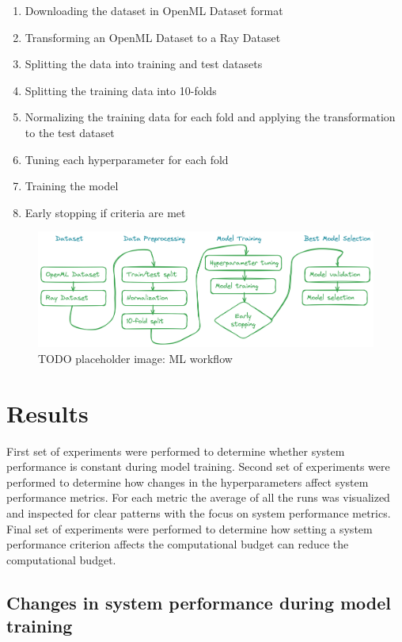 \begin{enumerate}
    \item Downloading the dataset in OpenML Dataset format
    \item Transforming an OpenML Dataset to a Ray Dataset
    \item Splitting the data into training and test datasets
    \item Splitting the training data into 10-folds
    \item Normalizing the training data for each fold and applying the transformation to the test dataset
    \item Tuning each hyperparameter for each fold
    \item Training the model
    \item Early stopping if criteria are met
\end{enumerate}

\begin{figure}[h]
    \includegraphics[width=12cm]{assets/ml_workflow1.png}
    \caption{TODO placeholder image: ML workflow}
    \label{figure:mlworkflow}
\end{figure}

\section{Results}

First set of experiments were performed to determine whether system performance is constant during model training. Second set of experiments were performed to determine how changes in the hyperparameters affect system performance metrics. For each metric the average of all the runs was visualized and inspected for clear patterns with the focus on system performance metrics. Final set of experiments were performed to determine how setting a system performance criterion affects the computational budget can reduce the computational budget.




\subsection{Changes in system performance during model training}


